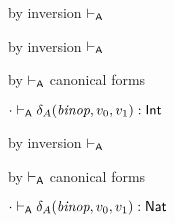 {\begin{lamportproof*}
    \begin{pfproof}
        \begin{pfproof}
          by inversion $\vdash_{\mathsf{A}}$
        \end{pfproof}
        \begin{pfproof}
            \begin{pfproof}
              by inversion $\vdash_{\mathsf{A}}$
            \end{pfproof}
            \begin{pfproof}
              by $\vdash_{\mathsf{A}}$ canonical forms
            \end{pfproof}
          \qedstep
            \begin{pfproof}
              ${\cdot} \vdash_{\mathsf{A}} \delta_{A}(\textit{binop}, v_0, v_1) : \mathsf{Int}$
            \end{pfproof}
        \end{pfproof}
        \begin{pfproof}
            \begin{pfproof}
              by inversion $\vdash_{\mathsf{A}}$
            \end{pfproof}
            \begin{pfproof}
              by $\vdash_{\mathsf{A}}$ canonical forms
            \end{pfproof}
          \qedstep
            \begin{pfproof}
              ${\cdot} \vdash_{\mathsf{A}} \delta_{A}(\textit{binop}, v_0, v_1) : \mathsf{Nat}$
            \end{pfproof}
        \end{pfproof}
    \end{pfproof}


\end{lamportproof*}}
